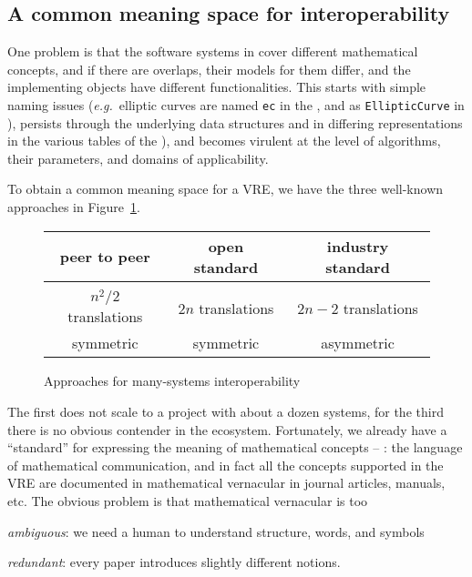 \subsection{A common meaning space for interoperability}

One problem is that the software systems in \ODK cover different mathematical concepts, and
if there are overlaps, their models for them differ, and the implementing objects have
different functionalities.
This starts with simple naming issues (\emph{e.g.}\ elliptic curves are named
\lstinline|ec| in the \LMFDB, and as \lstinline|EllipticCurve| in \Sage), persists through
the underlying data structures
and in differing representations in the various tables of the
\LMFDB), and becomes virulent at the level of algorithms, their parameters, and domains of
applicability.

To obtain a common meaning space for a VRE, we have the three well-known approaches in
Figure~\ref{fig:interop}.
\begin{figure}[ht]\centering
  \begin{tabular}{|c|c|c|}\hline
    peer to peer & open standard & industry standard\\\hline
     &  & \\\hline
    $n^2/2$  translations & $2n$ translations & $2n-2$ translations \\
    symmetric & symmetric & asymmetric\\\hline
  \end{tabular}
  \caption{Approaches for many-systems interoperability}\label{fig:interop}
\end{figure}

The first does not scale to a project with about a dozen systems, for the third there is
no obvious contender in the \ODK ecosystem. Fortunately, we already have a ``standard''
for expressing the meaning of mathematical concepts -- :
the language of mathematical communication, and in fact all the concepts supported in the
\ODK VRE are documented in mathematical vernacular in journal articles, manuals, etc.
The obvious problem is that mathematical vernacular is too
\begin{inparaenum}[\em i\rm)]
\item \emph{ambiguous}: we need a human to understand structure, words, and symbols
\item \emph{redundant}: every paper introduces slightly different notions. 
\end{inparaenum}

